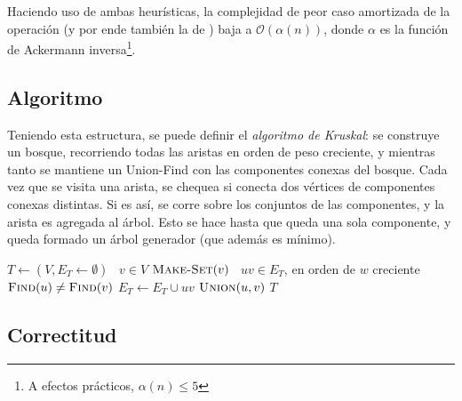 \documentclass[a4paper]{report}
\newcommand{\BigO}[1]{\ensuremath{\mathcal{O}(#1)}}
\newcommand{\Each}{\kw{each}\ }
\begin{document}
Haciendo uso de ambas heurísticas, la complejidad de peor caso amortizada de la operación  (y por ende también la de ) baja a \BigO{\alpha(n)}, donde $\alpha$ es la función de Ackermann inversa\footnote{A efectos prácticos, $\alpha(n) \leq 5$}.

\subsection{Algoritmo}

Teniendo esta estructura, se puede definir el \textit{algoritmo de Kruskal}: se construye un bosque, recorriendo todas las aristas en orden de peso creciente, y mientras tanto se mantiene un Union-Find con las componentes conexas del bosque. Cada vez que se visita una arista, se chequea si conecta dos vértices de componentes conexas distintas. Si es así, se corre  sobre los conjuntos de las componentes, y la arista es agregada al árbol. Esto se hace hasta que queda una sola componente, y queda formado un árbol generador (que además es mínimo).

\begin{codebox}
    \li $T \gets (V, E_T \gets \emptyset)$
    \li \For \Each $v \in V$ \Do
    \li $\textnormal{\scshape Make-Set}(v)$
    \End
    \li \For \Each $uv \in E_T$, en orden de $w$ creciente \Do
    \li \If $\textnormal{\scshape Find}(u) \neq \textnormal{\scshape Find}(v)$ \Then
    \li $E_T \gets E_T \cup {uv}$
    \li $\textnormal{\scshape Union}(u, v)$
    \End
    \li \Return $T$
\end{codebox}

\subsection{Correctitud}
\end{document}
